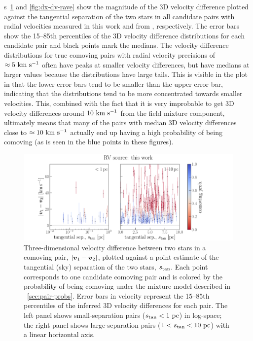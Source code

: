 \documentclass[modern, letterpaper]{aastex61}
\begin{document}
\figurename s~\ref{fig:dx-dv} and \ref{fig:dx-dv-rave} show the magnitude of the
3D velocity difference plotted against the tangential separation of the two
stars in all candidate pairs with radial velocities measured in this work and
from , respectively.
The error bars show the 15--85th percentiles of the 3D velocity difference
distributions for each candidate pair and black points mark the medians.
The velocity difference distributions for true comoving pairs with radial
velocity precisions of $\approx5~\mathrm{km}~\mathrm{s}^{-1}$ often have peaks at smaller velocity
differences, but have medians at larger values because the distributions have
large tails.
This is visible in the plot in that the lower error bars tend to be smaller than
the upper error bar, indicating that the distributions tend to be more
concentrated towards smaller velocities.
This, combined with the fact that it is very improbable to get 3D velocity
differences around $10~\mathrm{km}~\mathrm{s}^{-1}$ from the field mixture component, ultimately means
that many of the pairs with median 3D velocity differences close to $\approx
10~\mathrm{km}~\mathrm{s}^{-1}$ actually end up having a high probability of being comoving (as is seen
in the blue points in these figures).

\begin{figure}[htb]
  \begin{center}
    \includegraphics[width=0.9\linewidth]{dx-dv-apw.pdf}
  \end{center}
  \caption{%
    Three-dimensional velocity difference between two stars in a comoving pair,
    $|\boldsymbol{v}_1 - \boldsymbol{v}_2|$, plotted against a point estimate of the tangential
    (sky) separation of the two stars, $s_{\rm tan}$.
    Each point corresponds to one candidate comoving pair and is colored by the
    probability of being comoving under the mixture model described in
    \sectionname~\ref{sec:pair-probs}.
    Error bars in velocity represent the 15--85th percentiles of the inferred
    3D velocity differences for each pair.
    The left panel shows small-separation pairs ($s_{\rm tan} < 1~\mathrm{pc}$) in
    log-space; the right panel shows large-separation pairs ($1 < s_{\rm tan} <
    10~\mathrm{pc}$) with a linear horizontal axis.
    \label{fig:dx-dv}}
\end{figure}
\end{document}
